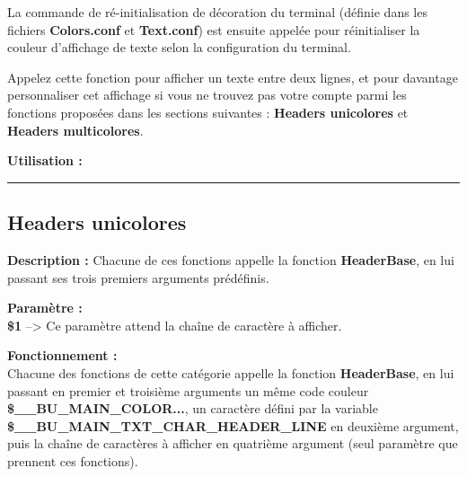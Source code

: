 \documentclass[a4paper,10pt]{article}
\begin{document}
\begin{justify}
    La commande de ré-initialisation de décoration du terminal (définie dans les fichiers \textbf{\color{lime}Colors.conf\color{white}} et \textbf{\color{lime}Text.conf\color{white}}) est ensuite appelée pour réinitialiser la couleur d'affichage de texte selon la configuration du terminal.
\end{justify}

\begin{justify}
    Appelez cette fonction pour afficher un texte entre deux lignes, et pour davantage personnaliser cet affichage si vous ne trouvez pas votre compte parmi les fonctions proposées dans les sections suivantes : \textbf{\color{green}Headers unicolores\color{white}} et \textbf{\color{green}Headers multicolores\color{white}}.
\end{justify}

\textbf{Utilisation :}\linebreak




\color{green}\par\noindent\rule{\textwidth}{0.4pt}\color{white}

\color{green}
\subsection{Headers unicolores}\color{white}

\begin{justify}
    \textbf{Description :}
    Chacune de ces fonctions appelle la fonction \textbf{\color{mauve}HeaderBase\color{white}}, en lui passant ses trois premiers arguments prédéfinis.
\end{justify}

\begin{justify}
    \textbf{Paramètre :}\\
    \textbf{\color{orange}\$1\color{white}} --> Ce paramètre attend la chaîne de caractère à afficher.
\end{justify}

\begin{justify}
    \textbf{Fonctionnement :}\\
    Chacune des fonctions de cette catégorie appelle la fonction \textbf{\color{mauve}HeaderBase\color{white}}, en lui passant en premier et troisième arguments un même code couleur \textbf{\color{orange}\$\_\_BU\_MAIN\_COLOR...\color{white}}, un caractère défini par la variable \textbf{\color{orange}\$\_\_BU\_MAIN\_TXT\_CHAR\_HEADER\_LINE\color{white}} en deuxième argument, puis la chaîne de caractères à afficher en quatrième argument (seul paramètre que prennent ces fonctions).
\end{justify}
\end{document}

